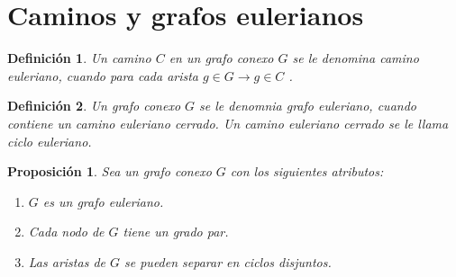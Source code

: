 \documentclass[12pt]{article}
\newtheorem{definition}{Definición}
\newtheorem{lemma}{Proposición}
\begin{document}
\section{Caminos y grafos eulerianos}
\begin{definition}
Un camino $C$ en un grafo conexo $G$ se le denomina \emph{camino euleriano}, cuando para cada arista $g \in G \rightarrow g \in C$ .
\end{definition}
\begin{definition}
Un grafo conexo $G$ se le denomnia \emph{grafo euleriano}, cuando contiene un camino euleriano cerrado. Un camino euleriano cerrado se le llama ciclo euleriano.
\end{definition}
\begin{lemma}
Sea un grafo conexo $G$ con los siguientes atributos:
\begin{enumerate}
\item $G$ es un grafo euleriano.
\item Cada nodo de $G$ tiene un grado par.
\item Las aristas de $G$ se pueden separar en ciclos disjuntos.
\end{enumerate}
\end{lemma}
\end{document}
